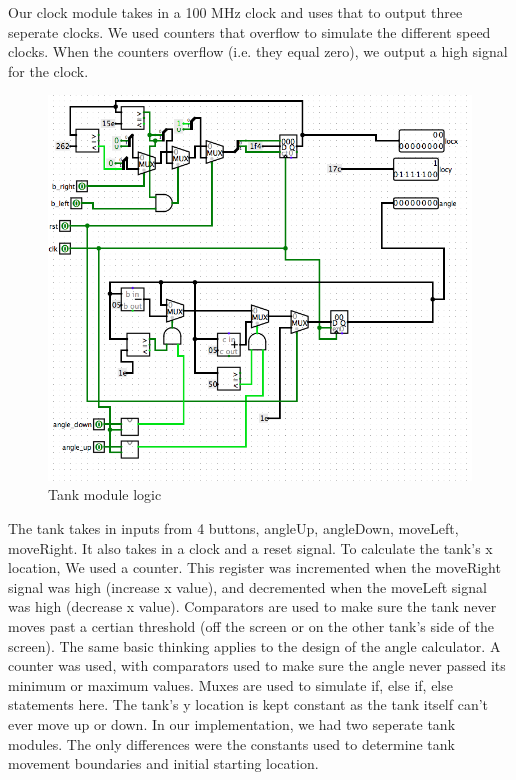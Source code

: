 \documentclass{article}
\begin{document}
Our clock module takes in a 100 MHz clock and uses that to output three seperate clocks. We used counters that overflow to simulate the different speed clocks. When the counters overflow (i.e. they equal zero), we output a high signal for the clock.

\begin{figure}[H]
	\begin{center}
		\includegraphics[width=1\textwidth]{tank.png} 
		\caption{Tank module logic}
	\end{center}
\end{figure}

The tank takes in inputs from 4 buttons, angleUp, angleDown, moveLeft, moveRight. It also takes in a clock and a reset signal. To calculate the tank's x location, We used a counter. This register was incremented when the moveRight signal was high (increase x value), and decremented when the moveLeft signal was high (decrease x value). Comparators are used to make sure the tank never moves past a certian threshold (off the screen or on the other tank's side of the screen). The same basic thinking applies to the design of the angle calculator. A counter was used, with comparators used to make sure the angle never passed its minimum or maximum values. Muxes are used to simulate if, else if, else statements here. The tank's y location is kept constant as the tank itself can't ever move up or down. In our implementation, we had two seperate tank modules. The only differences were the constants used to determine tank movement boundaries and initial starting location.
\end{document}

